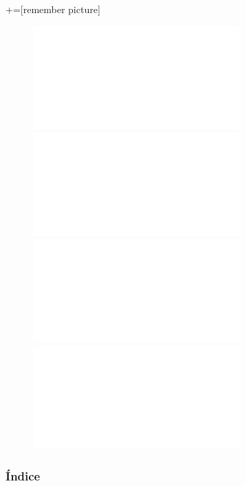 \documentclass[9pt,xcolor=svgnames]{beamer}
\begin{document}
+=[remember picture]
\everymath{\displaystyle}


\begin{frame}
 \thispagestyle{empty}

 \begin{figure}[t]
  \centering
  \includegraphics<1>[scale=0.7]{../Imagenes/logo_1.pdf}
  \includegraphics<2>[scale=0.7]{../Imagenes/logo_2.pdf}
  \includegraphics<3>[scale=0.7]{../Imagenes/logo_3.pdf}
  \includegraphics<4>[scale=0.7]{../Imagenes/logo_4.pdf}
 \end{figure}
\end{frame}



\begin{frame}
 \titlepage
\end{frame}

\normalsize

\begin{frame}
 \frametitle{Índice} 
 \transboxin
 \tableofcontents
\end{frame}
  
\end{document}
